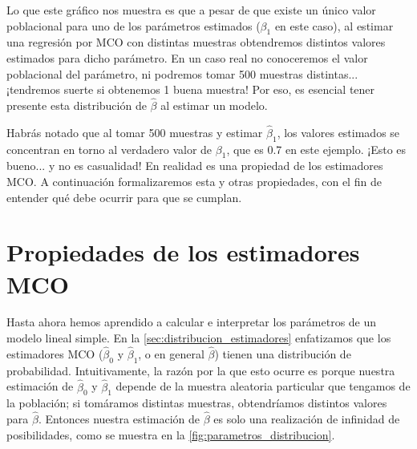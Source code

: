 \documentclass[12pt]{report}\usepackage[]{graphicx}\usepackage[]{color}
\begin{document}
Lo que este gráfico nos muestra es que a pesar de que existe un único valor poblacional para uno de los parámetros estimados ($\beta_1$ en este caso), al estimar una regresión por MCO con distintas muestras obtendremos distintos valores estimados para dicho parámetro.
En un caso real no conoceremos el valor poblacional del parámetro, ni podremos tomar 500 muestras distintas... ¡tendremos suerte si obtenemos 1 buena muestra! Por eso, es esencial tener presente esta distribución de $\hat\beta$ al estimar un modelo.

Habrás notado que al tomar 500 muestras y estimar $\hat\beta_1$, los valores estimados se concentran en torno al verdadero valor de $\beta_1$, que es 0.7 en este ejemplo. ¡Esto es bueno... y no es casualidad! En realidad es una propiedad de los estimadores MCO.
A continuación formalizaremos esta y otras propiedades, con el fin de entender qué debe ocurrir para que se cumplan.

\section{Propiedades de los estimadores MCO}

Hasta ahora hemos aprendido a calcular e interpretar los parámetros de un modelo lineal simple.
En la \autoref{sec:distribucion_estimadores} enfatizamos que los estimadores MCO ($\hat\beta_0$ y $\hat\beta_1$, o en general $\hat\beta$) tienen una distribución de probabilidad.
Intuitivamente, la razón por la que esto ocurre es porque nuestra estimación de $\hat\beta_0$ y $\hat\beta_1$ depende de la muestra aleatoria particular que tengamos de la población; si tomáramos distintas muestras, obtendríamos distintos valores para $\hat\beta$.
Entonces nuestra estimación de $\hat\beta$ es solo una realización de infinidad de posibilidades, como se muestra en la \autoref{fig:parametros_distribucion}.
\end{document}
